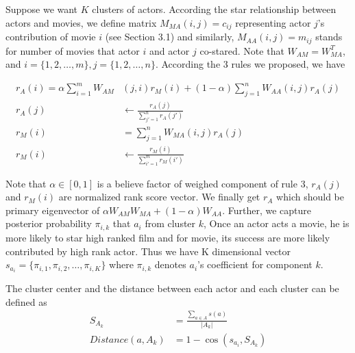 Suppose we want $K$ clusters of actors. According the star relationship between actors and movies, we define matrix $M_{MA}(i, j)=c_{ij}$ representing actor $j$'s contribution of movie $i$ (see Section 3.1) and similarly, $M_{AA}(i, j)= m_{ij}$ stands for number of movies that actor $i$ and actor $j$ co-stared. Note that $W_{AM} = W_{MA}^T$, and $i=\{1,2,\dots, m\}, j=\{1,2,\dots, n\}$. According the 3 rules we proposed, we have

\begin{subequations}
\begin{align}
  r_{A}(i) = \alpha \sum_{i=1}^{m}W_{AM}&(j, i)r_M(i) + (1-\alpha)\sum_{j=1}^{n}W_{AA}(i, j)r_A(j)\\
  r_{A}(j) &\leftarrow \frac{r_{A}(j)}{\sum_{j'=1}^{n}r_{A}(j')}\\
  r_{M}(i) &= \sum_{j=1}^{n}W_{MA}(i, j)r_A(j)\\
  r_{M}(i) &\leftarrow \frac{r_{M}(i)}{\sum_{i'=1}^{m}r_{M}(i')}
\end{align}
\end{subequations}

Note that $\alpha \in [0,1]$ is a believe factor of weighed component of rule 3,  $r_{A}(j)$ and $r_{M}(i)$ are normalized rank score vector. We finally get $r_A$ which should be primary eigenvector of $\alpha W_{AM}W_{MA} + (1-\alpha) W_{AA}$. Further, we capture posterior probability $\pi_{i,k}$ that $a_i$ from cluster $k$, Once an actor acts a movie, he is more likely to star high ranked film and for movie, its success are more likely contributed by high rank actor. Thus we have K dimensional vector $s_{a_i} = \{\pi_{i,1}, \pi_{i,2}, \dots, \pi_{i,K}\}$ where $\pi_{i,k}$ denotes $a_i$'s coefficient for component $k$.

The cluster center and the distance between each actor and each cluster can be defined as
\begin{subequations}
\begin{align}
  S_{A_k} &= \frac{\sum_{a \in A}s(a)}{|A_k|} \\
  Distance(a, A_k) &= 1-\cos(s_{a_i}, S_{A_k})
\end{align}
\end{subequations}

